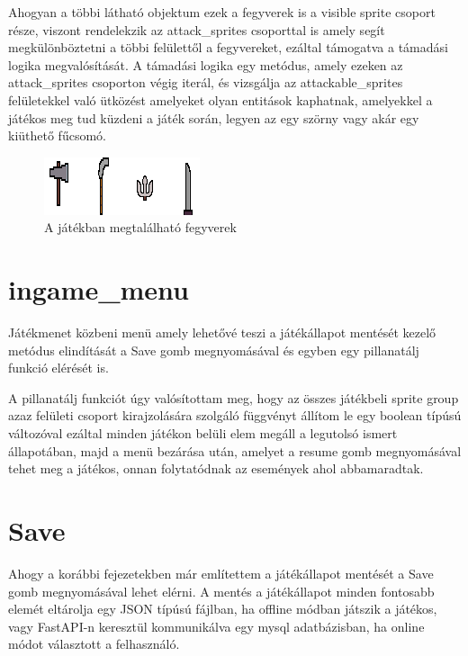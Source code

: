 Ahogyan a többi látható objektum ezek a fegyverek is a visible sprite csoport része, viszont rendelekzik az attack\_sprites csoporttal is amely segít megkülönböztetni a többi felülettől a fegyvereket, ezáltal támogatva a támadási logika megvalósítását. A támadási logika egy metódus, amely ezeken az attack\_sprites csoporton végig iterál, és vizsgálja az attackable\_sprites felületekkel való ütközést amelyeket olyan entitások kaphatnak, amelyekkel a játékos meg tud küzdeni a játék során, legyen az egy szörny vagy akár egy kiüthető fűcsomó.  

\begin{figure}[H]
    \centering
    \includegraphics[width=15.5truecm]{images/weapons.png}
    \caption{A játékban megtalálható fegyverek}
    \label{fig:A játékban megtalálható fegyverek}
\end{figure}


\section{ingame\_menu}

Játékmenet közbeni menü amely lehetővé teszi a játékállapot mentését kezelő metódus elindítását a Save gomb megnyomásával és egyben egy pillanatálj funkció elérését is. 

A pillanatálj funkciót úgy valósítottam meg, hogy az összes játékbeli sprite group azaz felületi csoport kirajzolására szolgáló függvényt állítom le egy boolean típúsú változóval ezáltal minden játékon belüli elem megáll a legutolsó ismert állapotában, majd a menü bezárása után, amelyet a resume gomb megnyomásával tehet meg a játékos, onnan folytatódnak az események ahol abbamaradtak.

\section{Save}

Ahogy a korábbi fejezetekben már említettem a játékállapot mentését a Save gomb megnyomásával lehet elérni. A mentés a játékállapot minden fontosabb elemét eltárolja egy JSON típúsú fájlban, ha offline módban játszik a játékos, vagy FastAPI-n keresztül kommunikálva egy mysql adatbázisban, ha online módot választott a felhasználó.






